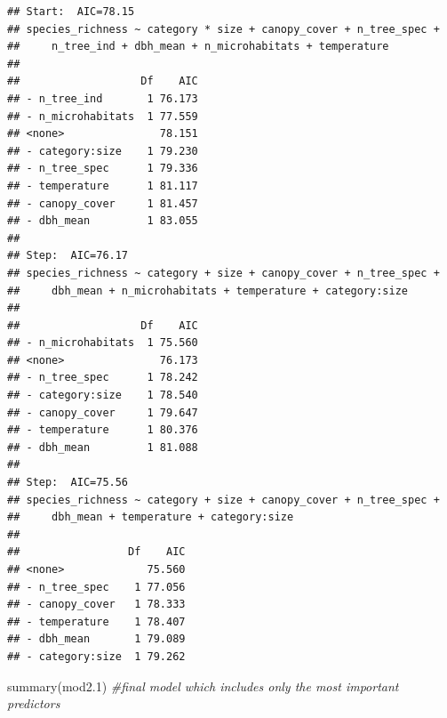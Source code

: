 \documentclass[
]{article}
\newenvironment{Shaded}{\begin{snugshade}}{\end{snugshade}}
\newcommand{\CommentTok}[1]{\textcolor[rgb]{0.56,0.35,0.01}{\textit{#1}}}
\newcommand{\FloatTok}[1]{\textcolor[rgb]{0.00,0.00,0.81}{#1}}
\newcommand{\FunctionTok}[1]{\textcolor[rgb]{0.00,0.00,0.00}{#1}}
\newcommand{\NormalTok}[1]{#1}
\begin{document}
\begin{verbatim}
## Start:  AIC=78.15
## species_richness ~ category * size + canopy_cover + n_tree_spec + 
##     n_tree_ind + dbh_mean + n_microhabitats + temperature
## 
##                   Df    AIC
## - n_tree_ind       1 76.173
## - n_microhabitats  1 77.559
## <none>               78.151
## - category:size    1 79.230
## - n_tree_spec      1 79.336
## - temperature      1 81.117
## - canopy_cover     1 81.457
## - dbh_mean         1 83.055
## 
## Step:  AIC=76.17
## species_richness ~ category + size + canopy_cover + n_tree_spec + 
##     dbh_mean + n_microhabitats + temperature + category:size
## 
##                   Df    AIC
## - n_microhabitats  1 75.560
## <none>               76.173
## - n_tree_spec      1 78.242
## - category:size    1 78.540
## - canopy_cover     1 79.647
## - temperature      1 80.376
## - dbh_mean         1 81.088
## 
## Step:  AIC=75.56
## species_richness ~ category + size + canopy_cover + n_tree_spec + 
##     dbh_mean + temperature + category:size
## 
##                 Df    AIC
## <none>             75.560
## - n_tree_spec    1 77.056
## - canopy_cover   1 78.333
## - temperature    1 78.407
## - dbh_mean       1 79.089
## - category:size  1 79.262
\end{verbatim}

\begin{Shaded}
\begin{Highlighting}[]
\FunctionTok{summary}\NormalTok{(mod2}\FloatTok{.1}\NormalTok{) }\CommentTok{\#final model which includes only the most important predictors }
\end{Highlighting}
\end{Shaded}
\end{document}

